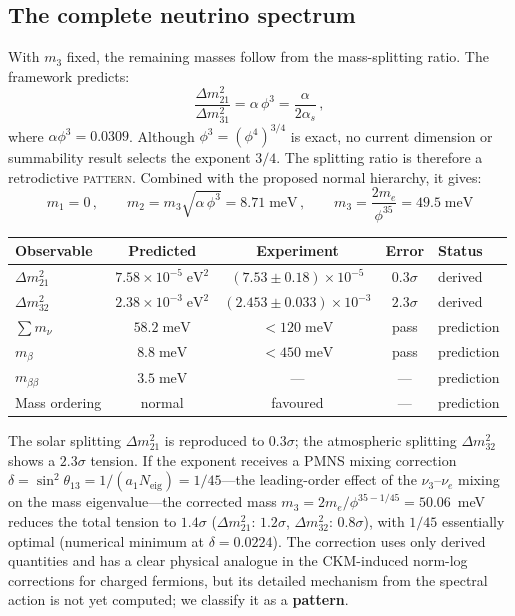 \documentclass[12pt,a4paper]{article}
\theoremstyle{definition}
\begin{document}
\subsection{The complete neutrino spectrum}\label{sec:nu_spectrum}

With $m_3$ fixed, the remaining masses follow from the mass-splitting ratio.  The framework predicts:
\begin{equation}
\frac{\Delta m^2_{21}}{\Delta m^2_{31}} = \alpha\,\phi^3 = \frac{\alpha}{2\alpha_s}\,,
\label{eq:dm_ratio}
\end{equation}
where $\alpha\phi^3=0.0309$.  Although $\phi^3=(\phi^4)^{3/4}$ is exact, no current dimension or summability result selects the exponent $3/4$.  The splitting ratio is therefore a retrodictive \textsc{pattern}.  Combined with the proposed normal hierarchy, it gives:
\begin{equation}
\boxed{m_1 = 0\,,\qquad m_2 = m_3\sqrt{\alpha\,\phi^3} = 8.71\;\text{meV}\,,\qquad m_3 = \frac{2m_e}{\phi^{35}} = 49.5\;\text{meV}}
\label{eq:nu_spectrum}
\end{equation}

\begin{center}
\begin{tabular}{lcccl}
\toprule
\textbf{Observable} & \textbf{Predicted} & \textbf{Experiment} & \textbf{Error} & \textbf{Status} \\
\midrule
$\Delta m^2_{21}$ & $7.58 \times 10^{-5}\;\text{eV}^2$ & $(7.53 \pm 0.18)\times 10^{-5}$ & $0.3\sigma$ & derived \\
$\Delta m^2_{32}$ & $2.38 \times 10^{-3}\;\text{eV}^2$ & $(2.453 \pm 0.033)\times 10^{-3}$ & $2.3\sigma$ & derived \\
$\sum m_\nu$ & $58.2\;\text{meV}$ & $< 120\;\text{meV}$ & pass & prediction \\
$m_\beta$ & $8.8\;\text{meV}$ & $< 450\;\text{meV}$ & pass & prediction \\
$m_{\beta\beta}$ & $3.5\;\text{meV}$ & --- & --- & prediction \\
Mass ordering & normal & favoured & --- & prediction \\
\bottomrule
\end{tabular}
\end{center}
The solar splitting $\Delta m^2_{21}$ is reproduced to $0.3\sigma$; the atmospheric splitting $\Delta m^2_{32}$ shows a $2.3\sigma$ tension.  If the exponent receives a PMNS mixing correction $\delta = \sin^2\theta_{13} = 1/(a_1 N_{\text{eig}}) = 1/45$---the leading-order effect of the $\nu_3$--$\nu_e$ mixing on the mass eigenvalue---the corrected mass $m_3 = 2m_e/\phi^{35 - 1/45} = 50.06$~meV reduces the total tension to $1.4\sigma$ ($\Delta m^2_{21}$: $1.2\sigma$, $\Delta m^2_{32}$: $0.8\sigma$), with $1/45$ essentially optimal (numerical minimum at $\delta = 0.0224$).  The correction uses only derived quantities and has a clear physical analogue in the CKM-induced norm-log corrections for charged fermions, but its detailed mechanism from the spectral action is not yet computed; we classify it as a \textbf{pattern}.
\end{document}
